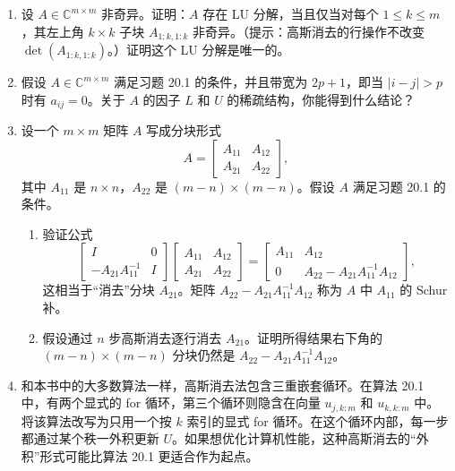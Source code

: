 \documentclass[UTF8,fontset=none,12pt]{ctexart}
\theoremstyle{definition}
\begin{document}
\begin{enumerate}[label=\textbf{20.\arabic*}]
    \item 设 $A\in\mathbb{C}^{m\times m}$ 非奇异。证明：$A$ 存在 LU 分解，当且仅当对每个 $1\le k\le m$，其左上角 $k\times k$ 子块 $A_{1:k,1:k}$ 非奇异。（提示：高斯消去的行操作不改变 $\det(A_{1:k,1:k})$。）证明这个 LU 分解是唯一的。

    \item 假设 $A\in\mathbb{C}^{m\times m}$ 满足习题 20.1 的条件，并且带宽为 $2p+1$，即当 $|i-j|>p$ 时有 $a_{ij}=0$。关于 $A$ 的因子 $L$ 和 $U$ 的稀疏结构，你能得到什么结论？

    \item 设一个 $m\times m$ 矩阵 $A$ 写成分块形式
    \[
    A=\begin{bmatrix}A_{11}&A_{12}\\A_{21}&A_{22}\end{bmatrix},
    \]
    其中 $A_{11}$ 是 $n\times n$，$A_{22}$ 是 $(m-n)\times(m-n)$。假设 $A$ 满足习题 20.1 的条件。

    \begin{enumerate}[label=(\alph*)]
        \item 验证公式
        \[
        \begin{bmatrix}
        I&0\\
        -A_{21}A_{11}^{-1}&I
        \end{bmatrix}
        \begin{bmatrix}
        A_{11}&A_{12}\\
        A_{21}&A_{22}
        \end{bmatrix}
        =
        \begin{bmatrix}
        A_{11}&A_{12}\\
        0&A_{22}-A_{21}A_{11}^{-1}A_{12}
        \end{bmatrix},
        \]
        这相当于“消去”分块 $A_{21}$。矩阵
        $A_{22}-A_{21}A_{11}^{-1}A_{12}$ 称为 $A$ 中 $A_{11}$ 的 Schur 补。

        \item 假设通过 $n$ 步高斯消去逐行消去 $A_{21}$。证明所得结果右下角的 $(m-n)\times(m-n)$ 分块仍然是
        $A_{22}-A_{21}A_{11}^{-1}A_{12}$。
    \end{enumerate}

    \item 和本书中的大多数算法一样，高斯消去法包含三重嵌套循环。在算法 20.1 中，有两个显式的 for 循环，第三个循环则隐含在向量 $u_{j,k:m}$ 和 $u_{k,k:m}$ 中。将该算法改写为只用一个按 $k$ 索引的显式 for 循环。在这个循环内部，每一步都通过某个秩一外积更新 $U$。如果想优化计算机性能，这种高斯消去的“外积”形式可能比算法 20.1 更适合作为起点。


\end{enumerate}
\end{document}
